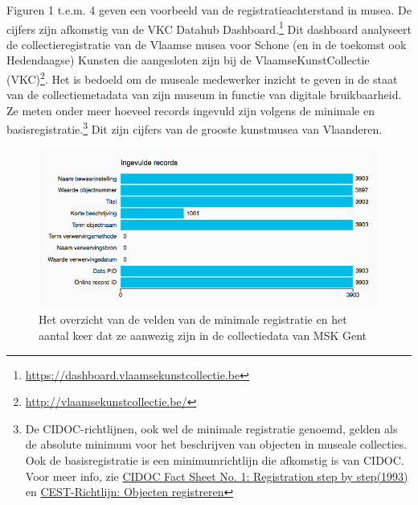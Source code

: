 \documentclass[fleqn,10pt]{voorstel}
\begin{document}
Figuren 1 t.e.m. 4 geven een voorbeeld van de registratieachterstand in musea. De cijfers zijn afkomstig van de VKC Datahub Dashboard.\footnote{\url{https://dashboard.vlaamsekunstcollectie.be}} Dit dashboard analyseert de collectieregistratie van de Vlaamse musea voor Schone (en in de toekomst ook Hedendaagse) Kunsten die aangesloten zijn bij de VlaamseKunstCollectie (VKC)\footnote{\url{http://vlaamsekunstcollectie.be/}}. Het is bedoeld om de museale medewerker inzicht te geven in de staat van de collectiemetadata van zijn museum in functie van digitale bruikbaarheid. Ze meten onder meer hoeveel records ingevuld zijn volgens de minimale en basisregistratie.\footnote{De CIDOC-richtlijnen, ook wel de minimale registratie genoemd, gelden als de absolute minimum voor het beschrijven van objecten in museale collecties. Ook de basisregistratie is een minimumrichtlijn die afkomstig is van CIDOC. Voor meer info, zie \href{http://network.icom.museum/fileadmin/user_upload/minisites/cidoc/DocStandards/CIDOC_Fact_Sheet_No_1.pdf}{CIDOC Fact Sheet No. 1: Registration step by step(1993)} en \href{https://www.projectcest.be/wiki/Richtlijn:Objecten_registreren}{CEST-Richtlijn: Objecten registreren}} Dit zijn cijfers van de grooste kunstmusea van Vlaanderen. 

\begin{figure}[h]
	\caption{Het overzicht van de velden van de minimale registratie en het aantal keer dat ze aanwezig zijn in de collectiedata van MSK Gent}
	\centering
	\includegraphics[width=\linewidth]{pictures/VKC_velden_minimale}
\end{figure}
\end{document}
